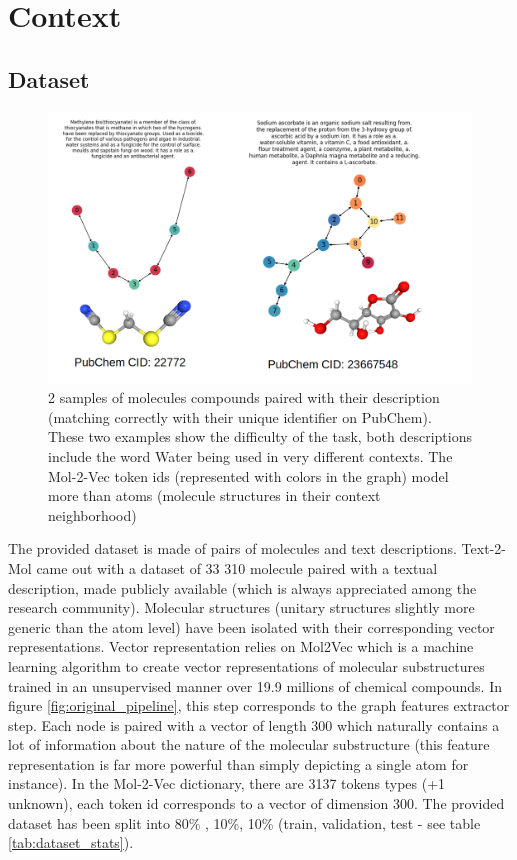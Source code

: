 \section{Context}
\label{sec:Context}


\subsection{Dataset}
\label{sec:dataset}
\begin{figure}
    \centering
    \includegraphics[width=1.\linewidth]{figures/molecule_visualizations.png}
    \caption{2 samples of molecules compounds paired with their description (matching correctly with their unique identifier on PubChem). These two examples show the difficulty of the task, both descriptions include the word Water being used in very different contexts. The Mol-2-Vec token ids (represented with colors in the graph) model more than atoms (molecule structures in their context neighborhood)}
    \label{fig:molecule_sample}
\end{figure}
The provided dataset is made of pairs of molecules and text descriptions. Text-2-Mol \cite{text2mol} came out with a dataset of 33 310 molecule paired with a textual description, made publicly available (which is always appreciated among the research community). Molecular structures (unitary structures slightly more generic than the atom level) have been isolated with their corresponding vector representations. Vector representation relies on Mol2Vec\cite{mol2vec} which is a machine learning algorithm to create vector representations of molecular substructures trained in an unsupervised manner over 19.9 millions of chemical compounds. In figure \ref{fig:original_pipeline}, this step corresponds to the graph features extractor step. Each node is paired with a vector of length 300 which naturally contains a lot of information about the nature of the molecular substructure (this feature representation is far more powerful than simply depicting a single atom for instance). In the Mol-2-Vec dictionary, there are 3137 tokens types (+1 unknown), each token id corresponds to a vector of dimension 300.
The provided dataset has been split into 80\% , 10\%, 10\% (train, validation, test - see table \ref{tab:dataset_stats}).

